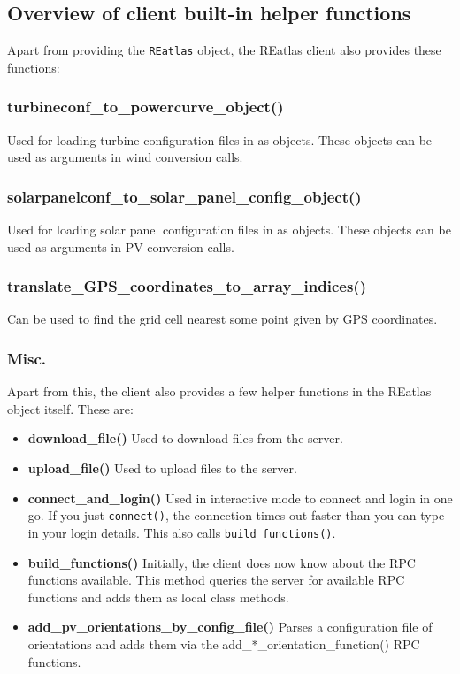 \documentclass[a4paper,10pt]{article}
\begin{document}
\subsection{Overview of client built-in helper functions}

Apart from providing the \verb+REatlas+ object, the REatlas client
also provides these functions:

\subsubsection{turbineconf\_to\_powercurve\_object()}

Used for loading turbine configuration files in as objects. These objects
can be used as arguments in wind conversion calls.

\subsubsection{solarpanelconf\_to\_solar\_panel\_config\_object()}

Used for loading solar panel configuration files in as objects.
These objects can be used as arguments in PV conversion calls.

\subsubsection{translate\_GPS\_coordinates\_to\_array\_indices()}

Can be used to find the grid cell nearest some point given by GPS coordinates.

\subsubsection{Misc.}

Apart from this, the client also provides a few helper functions in the
REatlas object itself. These are:

\begin{itemize}
     \item \textbf{download\_file()} Used to download files from the server.
     \item \textbf{upload\_file()} Used to upload files to the server.
     \item \textbf{connect\_and\_login()} Used in interactive mode to connect and login in one go. If you just \verb+connect()+, the connection times out faster than you can type in your login details. This also calls \verb+build_functions()+.
     \item \textbf{build\_functions()} Initially, the client does now know about the RPC functions available. This method queries the server for available RPC functions and adds them as local class methods.
     \item \textbf{add\_pv\_orientations\_by\_config\_file()} Parses a configuration file of orientations and adds them via the add\_*\_orientation\_function() RPC functions. 
\end{itemize}
\end{document}
